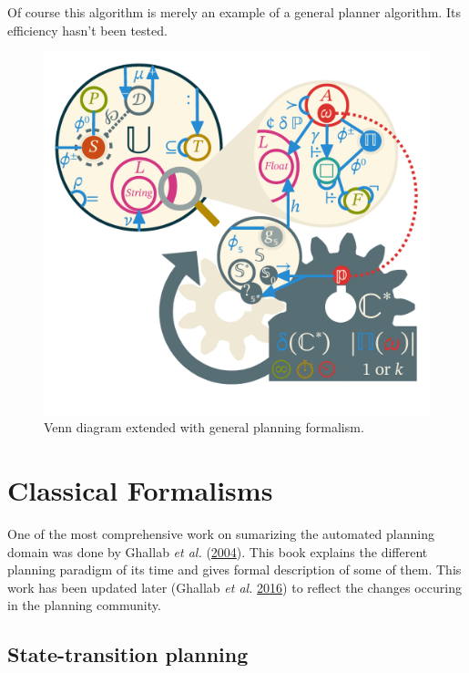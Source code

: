 \documentclass[11pt,a4paper,twoside,openright,titlepage,numbers=noenddot,headinclude,cleardoublepage=empty,openany]{scrreprt}
\theoremstyle{plain}
\theoremstyle{definition}
\theoremstyle{remark}
\begin{document}
Of course this algorithm is merely an example of a general planner
algorithm. Its efficiency hasn't been tested.

\begin{figure}
\hypertarget{fig:gplanner}{%
\centering
\includegraphics{./tex2pdf.-0b80fea6fd6da7f9/9fdd2b75f8eeba650391cde114b51007e94f9b01.pdf}
\caption{Venn diagram extended with general planning
formalism.}\label{fig:gplanner}
}
\end{figure}

\hypertarget{classical-formalisms}{%
\section{Classical Formalisms}\label{classical-formalisms}}

One of the most comprehensive work on sumarizing the automated planning
domain was done by Ghallab \emph{et al.}
(\protect\hyperlink{ref-ghallab_automated_2004}{2004}). This book
explains the different planning paradigm of its time and gives formal
description of some of them. This work has been updated later (Ghallab
\emph{et al.} \protect\hyperlink{ref-ghallab_automated_2016}{2016}) to
reflect the changes occuring in the planning community.

\hypertarget{state-transition-planning}{%
\subsection{State-transition planning}\label{state-transition-planning}}
\end{document}
